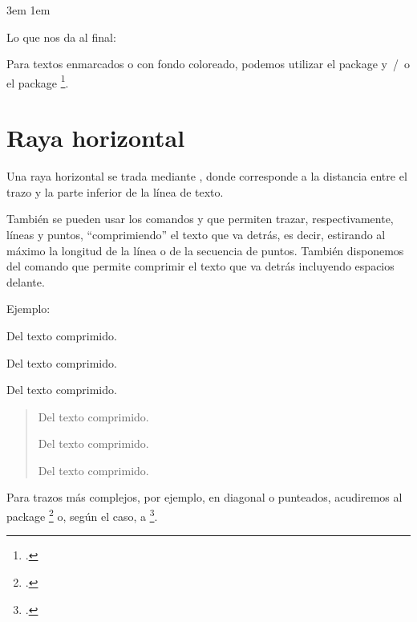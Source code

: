 \begin{latexcode}
\leftmargin 3em
\rightmargin 1em
\itshape
\end{latexcode}

Lo que nos da al final:

\begin{latexcode}
\makeatletter
\newenvironment{exemple}
               {\list{}{\listparindent 1.5em%
                        \itemindent    \listparindent
                        \leftmargin 3em
            \rightmargin 1em
            \itshape
                        \parsep        \z@ \@plus\p@}%
                \item\relax}
               {\endlist}
\makeatother
\end{latexcode}

\begin{plusloins}
Para textos enmarcados o con fondo coloreado, podemos utilizar el package  y~/~o el package \footcite[También podemos consultar, si nos gustan los rétos del código en \TeX~/~\LaTeX,][]{frama_boites}.
\end{plusloins}

\section{Raya horizontal}\label{filets}

Una raya horizontal se trada mediante , donde  corresponde a la distancia entre el trazo y la parte inferior de la línea de texto.

También se pueden usar los comandos  y  que permiten trazar, respectivamente, líneas y puntos, \enquote{comprimiendo} el texto que va detrás, es decir, estirando al máximo la longitud de la línea o de la secuencia de puntos. También disponemos del comando \label{hfill} que permite comprimir el texto que va detrás incluyendo espacios delante.

Ejemplo:

\begin{latexcode}
\hfill Del texto comprimido.

\hrulefill Del texto comprimido.

\dotfill Del texto comprimido.
\end{latexcode}

\begin{quotation}
\hfill Del texto comprimido.

\hrulefill Del texto comprimido.

\dotfill Del texto comprimido.
\end{quotation}

Para trazos más complejos, por ejemplo, en diagonal o punteados, acudiremos al package \footcite{eepic} o, según el caso, a \footcite{tikz}.



